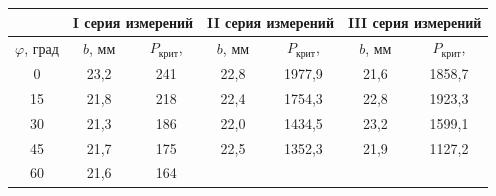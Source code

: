 \documentclass[a4paper,12pt]{article}
\begin{document}
\begin{table}[H]\label{tab: Data}
    \centering
    \begin{tabular}{|c|cc|cc|cc|}
        \hline
        {\color[HTML]{000000} } &
          \multicolumn{2}{c|}{{\color[HTML]{000000} I серия измерений}} &
          \multicolumn{2}{c|}{{\color[HTML]{000000} II серия измерений}} &
          \multicolumn{2}{c|}{{\color[HTML]{000000} III серия измерений}} \\ \hline
        {\color[HTML]{000000} $\varphi$, град} &
          \multicolumn{1}{c|}{{\color[HTML]{000000} $b$, мм}} &
          {\color[HTML]{000000} $P_{крит}$,} &
          \multicolumn{1}{c|}{{\color[HTML]{000000} $b$, мм}} &
          {\color[HTML]{000000} $P_{крит}$,} &
          \multicolumn{1}{c|}{{\color[HTML]{000000} $b$, мм}} &
          {\color[HTML]{000000} $P_{крит}$,} \\ \hline
        {\color[HTML]{000000} 0} &
          \multicolumn{1}{c|}{{\color[HTML]{000000} 23,2}} &
          {\color[HTML]{000000} 241} &
          \multicolumn{1}{c|}{{\color[HTML]{000000} 22,8}} &
          {\color[HTML]{000000} 1977,9} &
          \multicolumn{1}{c|}{{\color[HTML]{000000} 21,6}} &
          {\color[HTML]{000000} 1858,7} \\ \hline
        {\color[HTML]{000000} 15} &
          \multicolumn{1}{c|}{{\color[HTML]{000000} 21,8}} &
          {\color[HTML]{000000} 218} &
          \multicolumn{1}{c|}{{\color[HTML]{000000} 22,4}} &
          {\color[HTML]{000000} 1754,3} &
          \multicolumn{1}{c|}{{\color[HTML]{000000} 22,8}} &
          {\color[HTML]{000000} 1923,3} \\ \hline
        {\color[HTML]{000000} 30} &
          \multicolumn{1}{c|}{{\color[HTML]{000000} 21,3}} &
          {\color[HTML]{000000} 186} &
          \multicolumn{1}{c|}{{\color[HTML]{000000} 22,0}} &
          {\color[HTML]{000000} 1434,5} &
          \multicolumn{1}{c|}{{\color[HTML]{000000} 23,2}} &
          {\color[HTML]{000000} 1599,1} \\ \hline
        {\color[HTML]{000000} 45} &
          \multicolumn{1}{c|}{{\color[HTML]{000000} 21,7}} &
          {\color[HTML]{000000} 175} &
          \multicolumn{1}{c|}{{\color[HTML]{000000} 22,5}} &
          {\color[HTML]{000000} 1352,3} &
          \multicolumn{1}{c|}{{\color[HTML]{000000} 21,9}} &
          {\color[HTML]{000000} 1127,2} \\ \hline
        {\color[HTML]{000000} 60} &
          \multicolumn{1}{c|}{{\color[HTML]{000000} 21,6}} &
          {\color[HTML]{000000} 164} &

\end{tabular}
\end{table}
\end{document}
